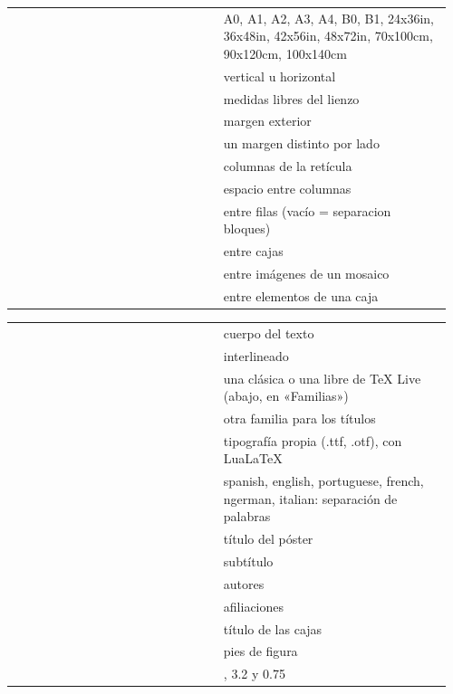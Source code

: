 \documentclass{article}
\newcommand{\bs}{\textbackslash}
\newcommand{\cod}[1]{{\ttfamily\tam{0.8}#1}}  %
\begin{document}
\newcommand{\clave}[2]{\cod{#1} & #2\\}
\newcommand{\grupo}[1]{\multicolumn{2}{@{}l}{\bfseries\color{pcPrimario}#1}\\\midrule}
\newcommand{\tablaclaves}[1]{\tam{0.9}\renewcommand{\arraystretch}{1.15}%
  \begin{tabular}[t]{@{}>{\raggedright\arraybackslash}p{0.46\linewidth}>{\raggedright\arraybackslash}p{0.5\linewidth}@{}}
  #1\end{tabular}}
\begin{fila}[columnas=3]
  \begin{columna}
    \begin{caja}[estilo=simple, titulo={Lienzo y retícula}]
      \tablaclaves{%
        \clave{tamano}{A0, A1, A2, A3, A4, B0, B1, 24x36in, 36x48in, 42x56in, 48x72in, 70x100cm, 90x120cm, 100x140cm}
        \clave{orientacion}{vertical u horizontal}
        \clave{ancho, alto (841mm, 1189mm)}{medidas libres del lienzo}
        \clave{margen (28mm)}{margen exterior}
        \clave{margen superior, inferior, izquierdo, derecho}{un margen distinto por lado}
        \clave{columnas (3)}{columnas de la retícula}
        \clave{separacion (20mm)}{espacio entre columnas}
        \clave{separacion filas}{entre filas (vacío = separacion bloques)}
        \clave{separacion bloques (0.9em)}{entre cajas}
        \clave{separacion imagenes (0.45em)}{entre imágenes de un mosaico}
        \clave{separacion elementos (0.35em)}{entre elementos de una caja}}
    \end{caja}
  \end{columna}
  \begin{columna}
    \begin{caja}[estilo=simple, titulo={Tipografía (múltiplos de «fuente»)}]
      \tablaclaves{%
        \clave{fuente (30pt)}{cuerpo del texto}
        \clave{interlinea (1.28)}{interlineado}
        \clave{familia (helvetica)}{una clásica o una libre de TeX Live (abajo, en «Familias»)}
        \clave{familia titulos}{otra familia para los títulos}
        \clave{\bs posterfamilia}{tipografía propia (.ttf, .otf), con LuaLaTeX}
        \clave{idioma}{spanish, english, portuguese, french, ngerman, italian: separación de palabras}
        \clave{escala titulo (3.3)}{título del póster}
        \clave{escala subtitulo (1.75)}{subtítulo}
        \clave{escala autores (1.4)}{autores}
        \clave{escala afiliaciones (1.0)}{afiliaciones}
        \clave{escala bloque (1.35)}{título de las cajas}
        \clave{escala pie (0.8)}{pies de figura}
        \clave{escala cita, cifra, referencias}{1.5, 3.2 y 0.75}
}
\end{caja}
\end{columna}
\end{fila}
\end{document}
